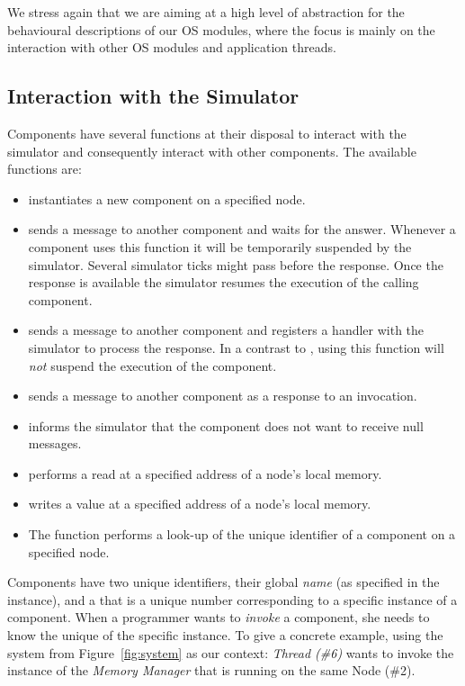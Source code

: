 We stress again that we are aiming at a high level of abstraction for the behavioural descriptions of our OS modules, where the focus is mainly on the interaction with other OS modules and application threads.


\subsection{Interaction with the Simulator}

Components have several functions at their disposal to interact with the simulator and consequently interact with other components.
The available functions are:
\begin{itemize}
\item {}
instantiates a new component on a specified node.
\item {}
sends a message to another component and waits for the answer.
Whenever a component uses this function it will be temporarily suspended by the simulator.
Several simulator ticks might pass before the response.
Once the response is available the simulator resumes the execution of the calling component.
\item {}
sends a message to another component and registers a handler with the simulator to process the response.
In a contrast to , using this function will \emph{not} suspend the execution of the component.
\item {}
sends a message to another component as a response to an invocation.
\item {}
informs the simulator that the component does not want to receive null messages.
\item {}
performs a read at a specified address of a node's local memory.
\item {}
writes a value at a specified address of a node's local memory.
\item The function {}
performs a look-up of the unique identifier of a component on a specified node.
\end{itemize}
Components have two unique identifiers, their global \emph{name} (as specified in the  instance), and a  that is a unique number corresponding to a specific instance of a component.
When a programmer wants to \emph{invoke} a component, she needs to know the unique \mbox{} of the specific instance.
To give a concrete example, using the system from Figure~\ref{fig:system} as our context: \emph{Thread (\#6)} wants to invoke the instance of the \emph{Memory Manager} that is running on the same Node (\#2).
